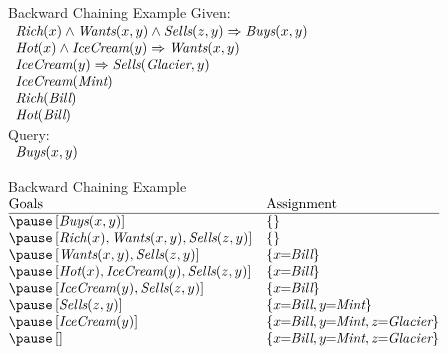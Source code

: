 \documentclass[12pt]{beamer}
\newcommand{\EM}[1]{\mbox{\em#1}}
\newcommand{\limpl}{\Rightarrow}
\begin{document}
\begin{frame}{Backward Chaining Example}
	Given:
	\\[.5em]
	$
	\begin{array}{l}
		\EM{Rich}(x) \land \EM{Wants}(x, y) \land \EM{Sells}(z, y) \limpl \EM{Buys}(x, y) \\
		\EM{Hot}(x) \land \EM{IceCream}(y) \limpl \EM{Wants}(x, y) \\
		\EM{IceCream}(y) \limpl \EM{Sells}(\EM{Glacier}, y) \\
		\EM{IceCream}(\EM{Mint}) \\
		\EM{Rich}(\EM{Bill}) \\
		\EM{Hot}(\EM{Bill})
	\end{array}
	$
	\\[1em]
	Query:
	\\[.5em]
	$
	\begin{array}{l}
		\EM{Buys}(x, y)
	\end{array}
	$
\end{frame}
\begin{frame}{Backward Chaining Example}
	\small
	$
	\begin{array}{@{}ll@{}}
		\mbox{Goals}                                                        & \mbox{Assignment} \\
		\hline
		\pause\left[\EM{Buys}(x, y)\right]                                  & \{\} \\
		\pause\left[\EM{Rich}(x), \EM{Wants}(x, y), \EM{Sells}(z, y)\right] & \{\} \\
		\pause\left[\EM{Wants}(x, y), \EM{Sells}(z, y)\right]               & \{x\!\!=\!\!\EM{Bill}\} \\
		\pause\left[\EM{Hot}(x), \EM{IceCream}(y), \EM{Sells}(z, y)\right]  & \{x\!\!=\!\!\EM{Bill}\} \\
		\pause\left[\EM{IceCream}(y), \EM{Sells}(z, y)\right]               & \{x\!\!=\!\!\EM{Bill}\} \\
		\pause\left[\EM{Sells}(z, y)\right]                                 & \{x\!\!=\!\!\EM{Bill}, y\!\!=\!\!\EM{Mint}\} \\
		\pause\left[\EM{IceCream}(y)\right]                                 & \{x\!\!=\!\!\EM{Bill}, y\!\!=\!\!\EM{Mint}, z\!\!=\!\!\EM{Glacier}\} \\
		\pause\left[\right]                                                 & \{x\!\!=\!\!\EM{Bill}, y\!\!=\!\!\EM{Mint}, z\!\!=\!\!\EM{Glacier}\} \\
	\end{array}
	$
\end{frame}
\end{document}
